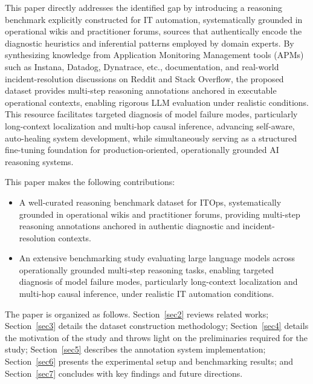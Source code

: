 \documentclass[conference]{IEEEtran}
\begin{document}
This paper directly addresses the identified gap by introducing a reasoning benchmark explicitly constructed for IT automation, systematically grounded in operational wikis and practitioner forums, sources that authentically encode the diagnostic heuristics and inferential patterns employed by domain experts. By synthesizing knowledge from Application Monitoring Management tools (APMs) such as Instana, Datadog, Dynatrace, etc., documentation, and real-world incident-resolution discussions on Reddit and Stack Overflow, the proposed dataset provides multi-step reasoning annotations anchored in executable operational contexts, enabling rigorous LLM evaluation under realistic conditions. This resource facilitates targeted diagnosis of model failure modes, particularly long-context localization and multi-hop causal inference, advancing self-aware, auto-healing system development, while simultaneously serving as a structured fine-tuning foundation for production-oriented, operationally grounded AI reasoning systems.



This paper makes the following contributions:
\begin{itemize}

    \item A well-curated reasoning benchmark dataset for ITOps, systematically grounded in operational wikis and practitioner forums, providing multi-step reasoning annotations anchored in authentic diagnostic and incident-resolution contexts.
    
    \item An extensive benchmarking study evaluating large language models across operationally grounded multi-step reasoning tasks, enabling targeted diagnosis of model failure modes, particularly long-context localization and multi-hop causal inference, under realistic IT automation conditions.
    
\end{itemize}


The paper is organized as follows. Section~\ref{sec2} reviews related works; Section~\ref{sec3} details the dataset construction methodology; Section~\ref{sec4} details the motivation of the study and throws light on the preliminaries required for the study; Section~\ref{sec5} describes the annotation system implementation; Section~\ref{sec6} presents the experimental setup and benchmarking results; and Section~\ref{sec7} concludes with key findings and future directions.
\end{document}
